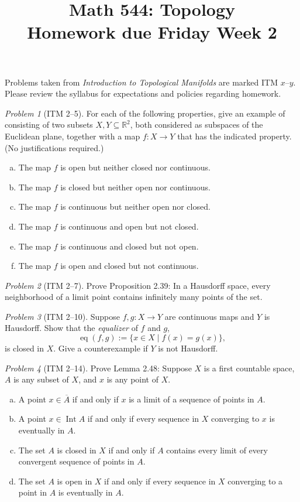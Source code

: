 \documentclass[11pt,twoside]{amsart}
\title{Math 544: Topology\\ Homework due Friday Week 2}
\theoremstyle{plain}
\theoremstyle{remark}
\newtheorem{prob}{Problem}
\theoremstyle{definition}
\theoremstyle{definition}
\newcommand{\RR}{\mathbb{R}}
\newcommand{\ol}{\overline}
\newcommand{\Int}{\operatorname{Int}}
\begin{document}
\maketitle

\noindent Problems taken from \emph{Introduction to Topological Manifolds} are marked ITM $x$--$y$. Please review the syllabus for expectations and policies regarding homework.

\begin{prob}[ITM 2--5]
For each of the following properties, give an example of consisting of two subsets $X,Y\subseteq \RR^2$, both considered as subspaces of the Euclidean plane, together with a map $f\colon X\to Y$ that has the indicated property. (No justifications required.)
\begin{enumerate}[(a)]
  \item The map $f$ is open but neither closed nor continuous.
  \item The map $f$ is closed but neither open nor continuous.
  \item The map $f$ is continuous but neither open nor closed.
  \item The map $f$ is continuous and open but not closed.
  \item The map $f$ is continuous and closed but not open.
  \item The map $f$ is open and closed but not continuous.
\end{enumerate}
\end{prob}

\begin{prob}[ITM 2--7]
Prove Proposition 2.39: In a Hausdorff space, every neighborhood of a limit point contains infinitely many points of the set.
\end{prob}

\begin{prob}[ITM 2--10]
Suppose $f,g\colon X\to Y$ are continuous maps and $Y$ is Hausdorff. Show that the \emph{equalizer} of $f$ and $g$,
\[
  \operatorname{eq}(f,g) := \{x\in X\mid f(x)=g(x)\},
\]
is closed in $X$. Give a counterexample if $Y$ is not Hausdorff.
\end{prob}

\begin{prob}[ITM 2--14]
Prove Lemma 2.48: Suppose $X$ is a first countable space, $A$ is any subset of $X$, and $x$ is any point of $X$.
\begin{enumerate}[(a)]
  \item A point $x\in \ol A$ if and only if $x$ is a limit of a sequence of points in $A$.
  \item A point $x\in \Int A$ if and only if every sequence in $X$ converging to $x$ is eventually in $A$.
  \item The set $A$ is closed in $X$ if and only if $A$ contains every limit of every convergent sequence of points in $A$.
  \item The set $A$ is open in $X$ if and only if every sequence in $X$ converging to a point in $A$ is eventually in $A$.
\end{enumerate}
\end{prob}
\end{document}
